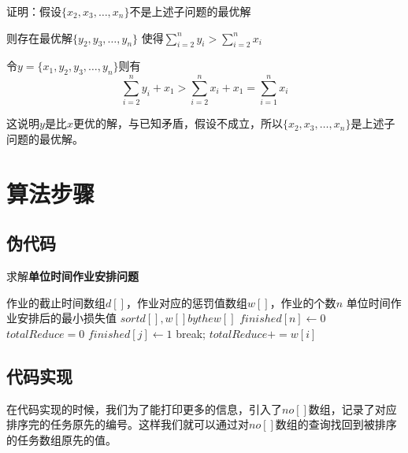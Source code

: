 \documentclass[11pt]{ctexart}
\begin{document}
证明：假设$\{x_2, x_3,\dots ,x_n\}$不是上述子问题的最优解

则存在最优解$\{y_2, y_3, \dots, y_n\}$ 使得$\sum_{i=2}^{n}y_i > \sum_{i=2}^{n}x_i$

令$y=\{x_1,y_2, y_3, \dots, y_n\}$则有$$\sum_{i=2}^{n}y_i + x_1 > \sum_{i=2}^{n}x_i+x_1 = \sum_{i=1}^{n}x_i$$

这说明$y$是比$x$更优的解，与已知矛盾，假设不成立，所以$\{x_2, x_3,\dots ,x_n\}$是上述子问题的最优解。

\section{算法步骤}

\subsection{伪代码}
\begin{algorithm}[H]
\caption{求解\textbf{单位时间作业安排问题}}
\begin{algorithmic}[1] %
\Require 作业的截止时间数组$d[]$，作业对应的惩罚值数组$w[]$，作业的个数$n$
\Ensure 单位时间作业安排后的最小损失值
\State $sort d[], w[] by the w[] $
\State $finished[n] \gets 0$
\State $totalReduce = 0$
            \State $finished[j] \gets 1$
            \State break;
        \EndIf
    \EndFor
        \State $totalReduce += w[i]$
    \EndIf
\EndFor
\State{}
\EndFunction
\end{algorithmic}
\end{algorithm}

\subsection{代码实现}
在代码实现的时候，我们为了能打印更多的信息，引入了$no[]$数组，记录了对应排序完的任务原先的编号。这样我们就可以通过对$no[]$数组的查询找回到被排序的任务数组原先的值。
\end{document}
